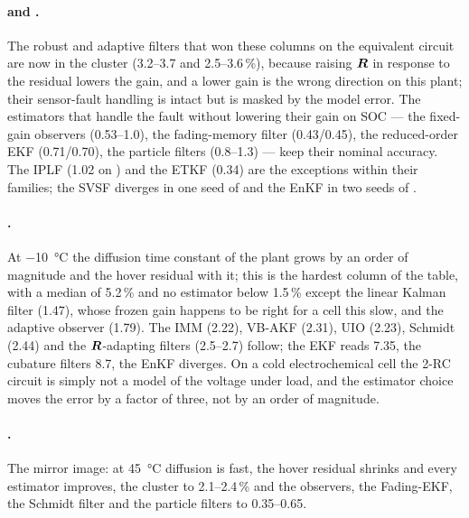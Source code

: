 \paragraph{ and .} The robust and adaptive filters that won
these columns on the equivalent circuit are now in the cluster (\num{3.2}--\num{3.7} and
\num{2.5}--\num{3.6}\,\%), because raising $\bm{R}$ in response to the residual lowers the gain,
and a lower gain is the wrong direction on this plant; their sensor-fault handling is intact
but is masked by the model error. The estimators that handle the fault without lowering their
gain on SOC --- the fixed-gain observers (\num{0.53}--\num{1.0}), the fading-memory filter
(\num{0.43}/\num{0.45}), the reduced-order EKF (\num{0.71}/\num{0.70}), the particle filters
(\num{0.8}--\num{1.3}) --- keep their nominal accuracy. The IPLF (\num{1.02} on
) and the ETKF (\num{0.34}) are the exceptions within their families; the SVSF
diverges in one seed of  and the EnKF in two seeds of .

\paragraph{.} At \SI{-10}{\celsius} the diffusion time constant of the plant grows by
an order of magnitude and the hover residual with it; this is the hardest column of the table,
with a median of \num{5.2}\,\% and no estimator below \num{1.5}\,\% except the linear Kalman
filter (\num{1.47}), whose frozen gain happens to be right for a cell this slow, and the
adaptive observer (\num{1.79}). The IMM (\num{2.22}), VB-AKF (\num{2.31}), UIO (\num{2.23}),
Schmidt (\num{2.44}) and the $\bm{R}$-adapting filters (\num{2.5}--\num{2.7}) follow; the EKF
reads \num{7.35}, the cubature filters \num{8.7}, the EnKF diverges. On a cold
electrochemical cell the 2-RC circuit is simply not a model of the voltage under load, and
the estimator choice moves the error by a factor of three, not by an order of magnitude.

\paragraph{.} The mirror image: at \SI{45}{\celsius} diffusion is fast, the hover
residual shrinks and every estimator improves, the cluster to \num{2.1}--\num{2.4}\,\% and the
observers, the Fading-EKF, the Schmidt filter and the particle filters to \num{0.35}--\num{0.65}.

